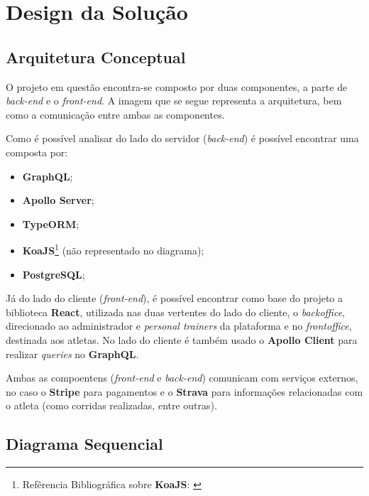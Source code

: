 \chapter{Design da Solução}

\section{Arquitetura Conceptual}

O projeto em questão encontra-se composto por duas componentes, a parte de \textit{back-end} e o \textit{front-end}. A imagem que se segue representa a arquitetura, bem como a comunicação entre ambas as componentes.


Como é possível analisar do lado do servidor (\textit{back-end}) é possível encontrar uma \textbf{} composta por:

\begin{itemize}
	\item \textbf{GraphQL};
	\item \textbf{Apollo Server};
	\item \textbf{TypeORM};
	\item \textbf{KoaJS}\footnote{Refêrencia Bibliográfica sobre \textbf{KoaJS}: \cite{expressVsKoa,introkoa}} {\small(não representado no diagrama)};
	\item \textbf{PostgreSQL};
\end{itemize}

Já do lado do cliente (\textit{front-end}), é possível encontrar como base do projeto a biblioteca \textbf{React}, utilizada nas duas vertentes do lado do cliente, o \textit{backoffice}, direcionado ao administrador e \textit{personal trainers} da plataforma e no \textit{frontoffice}, destinada aos atletas. No lado do cliente é também usado o \textbf{Apollo Client} para realizar \textit{queries} no \textbf{GraphQL}.

Ambas as compoentens (\textit{front-end} e \textit{back-end}) comunicam com serviços externos, no caso o \textbf{Stripe} para pagamentos e o \textbf{Strava} para informações relacionadas com o atleta (como corridas realizadas, entre outras).


\section{Diagrama Sequencial}